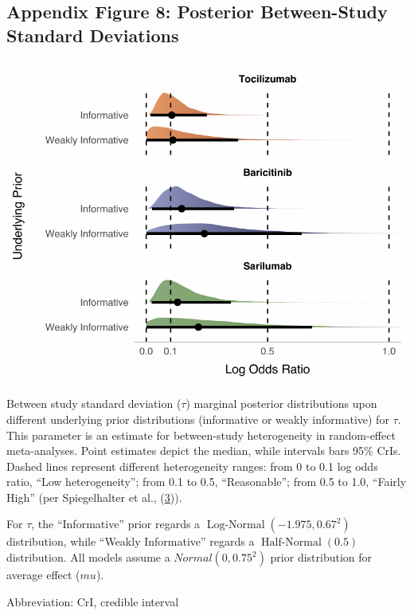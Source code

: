 \documentclass[
  12pt,
]{article}
\begin{document}
\hypertarget{appendix-figure-8-posterior-between-study-standard-deviations}{%
\subsection{Appendix Figure 8: Posterior Between-Study Standard
Deviations}\label{appendix-figure-8-posterior-between-study-standard-deviations}}

\begin{center}\includegraphics{supplementary_material_files/figure-latex/tau figure display-1} \end{center}

Between study standard deviation (\(\tau\)) marginal posterior
distributions upon different underlying prior distributions (informative
or weakly informative) for \(\tau\). This parameter is an estimate for
between-study heterogeneity in random-effect meta-analyses. Point
estimates depict the median, while intervals bars 95\% CrIs. Dashed
lines represent different heterogeneity ranges: from 0 to 0.1 log odds
ratio, ``Low heterogeneity''; from 0.1 to 0.5, ``Reasonable''; from 0.5
to 1.0, ``Fairly High'' (per Spiegelhalter et al.,
(\protect\hyperlink{ref-spiegelhalter2004}{3})).

For \(\tau\), the ``Informative'' prior regards a
\(\operatorname{Log-Normal}(-1.975, 0.67^2)\) distribution, while
``Weakly Informative'' regards a \(\operatorname{Half-Normal}(0.5)\)
distribution. All models assume a \(Normal(0, 0.75^2)\) prior
distribution for average effect (\(mu\)).

Abbreviation: CrI, credible interval
\end{document}
